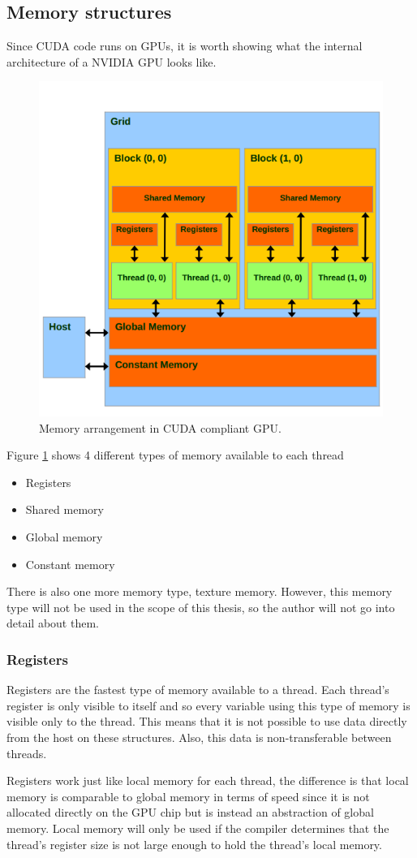 \documentclass[12pt]{book}
\begin{document}
\subsection{Memory structures}
Since CUDA code runs on GPUs, it is worth showing what the internal architecture of a NVIDIA GPU looks like. 
\begin{figure}[H]
	\centering
	\includegraphics[width=0.8\linewidth]{Resources/Images/cudaMemory.png}
	\caption{Memory arrangement in CUDA compliant GPU.}
	\label{fig:memCuda}
\end{figure}

Figure \ref{fig:memCuda} shows 4 different types of memory available to each thread
\begin{itemize}
	\item Registers
	\item Shared memory
	\item Global memory
	\item Constant memory
\end{itemize}

There is also one more memory type, texture memory. However, this memory type will not be used in the scope of this thesis, so the author will not go into detail about them.
\subsubsection{Registers}
Registers are the fastest type of memory available to a thread. Each thread's register is only visible to itself and so every variable using this type of memory is visible only to the thread. This means that it is not possible to use data directly from the host on these structures. Also, this data is non-transferable between threads. \par Registers work just like local memory for each thread, the difference is that local memory is comparable to global memory in terms of speed since it is not allocated directly on the GPU chip but is instead an abstraction of global memory. Local memory will only be used if the compiler determines that the thread's register size is not large enough to hold the thread's local memory.
\end{document}
